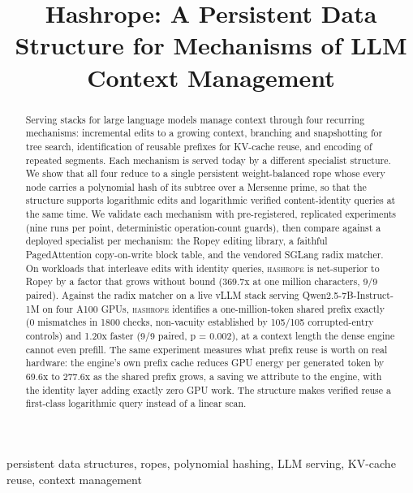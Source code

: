 \documentclass[10pt,conference]{IEEEtran}
\newcommand{\hr}{\textsc{hashrope}}
\begin{document}
\title{Hashrope: A Persistent Data Structure for Mechanisms of LLM Context
Management}

\author{
}

\maketitle

\begin{abstract}
Serving stacks for large language models manage context through four
recurring mechanisms: incremental edits to a growing context, branching
and snapshotting for tree search, identification of reusable prefixes for
KV-cache reuse, and encoding of repeated segments. Each mechanism is
served today by a different specialist structure. We show that all four
reduce to a single persistent weight-balanced rope whose every node
carries a polynomial hash of its subtree over a Mersenne prime, so that
the structure supports logarithmic edits and logarithmic verified
content-identity queries at the same time. We validate each mechanism
with pre-registered, replicated experiments (nine runs per point,
deterministic operation-count guards), then compare against a deployed
specialist per mechanism: the Ropey editing library, a faithful
PagedAttention copy-on-write block table, and the vendored SGLang radix
matcher. On workloads that interleave edits with identity queries, \hr{}
is net-superior to Ropey by a factor that grows without bound (369.7x at
one million characters, 9/9 paired). Against the radix matcher on a live
vLLM stack serving Qwen2.5-7B-Instruct-1M on four A100 GPUs, \hr{}
identifies a one-million-token shared prefix exactly (0 mismatches in
1800 checks, non-vacuity established by 105/105 corrupted-entry
controls) and 1.20x faster (9/9 paired, p = 0.002), at a context length
the dense engine cannot even prefill. The same experiment measures what
prefix reuse is worth on real hardware: the engine's own prefix cache
reduces GPU energy per generated token by 69.6x to 277.6x as the shared
prefix grows, a saving we attribute to the engine, with the identity
layer adding exactly zero GPU work. The structure makes verified reuse a
first-class logarithmic query instead of a linear scan.
\end{abstract}

\begin{IEEEkeywords}
persistent data structures, ropes, polynomial hashing, LLM serving,
KV-cache reuse, context management
\end{IEEEkeywords}
\end{document}
